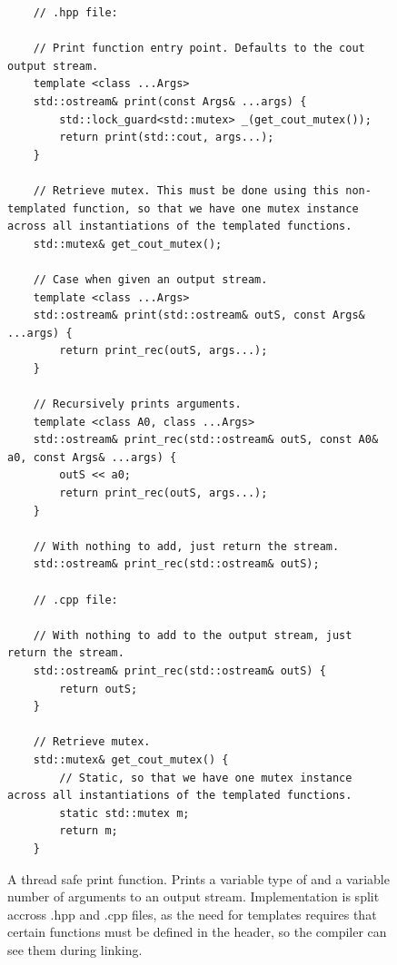 \begin{figure}
	\begin{lstlisting}
	// .hpp file:

	// Print function entry point. Defaults to the cout output stream.
	template <class ...Args>
	std::ostream& print(const Args& ...args) {
	    std::lock_guard<std::mutex> _(get_cout_mutex());
	    return print(std::cout, args...);
	}

	// Retrieve mutex. This must be done using this non-templated function, so that we have one mutex instance across all instantiations of the templated functions.
	std::mutex& get_cout_mutex();

	// Case when given an output stream.
	template <class ...Args>
	std::ostream& print(std::ostream& outS, const Args& ...args) {
	    return print_rec(outS, args...);
	}

	// Recursively prints arguments.
	template <class A0, class ...Args>
	std::ostream& print_rec(std::ostream& outS, const A0& a0, const Args& ...args) {
	    outS << a0;
	    return print_rec(outS, args...);
	}

	// With nothing to add, just return the stream. 
	std::ostream& print_rec(std::ostream& outS);

	// .cpp file:

	// With nothing to add to the output stream, just return the stream.
	std::ostream& print_rec(std::ostream& outS) {
	    return outS;
	}

	// Retrieve mutex.
	std::mutex& get_cout_mutex() {
		// Static, so that we have one mutex instance across all instantiations of the templated functions.
	    static std::mutex m;
	    return m;
	}
	\end{lstlisting}

	\caption{A thread safe print function. Prints a variable type of and a variable number of arguments to an output stream. Implementation is split accross .hpp and .cpp files, as the need for templates requires that certain functions must be defined in the header, so the compiler can see them during linking.}
	\label{fig:implementation_thread_safe_print}
\end{figure}



